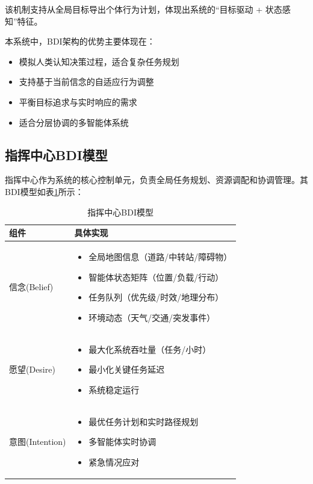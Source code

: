 \documentclass[12pt,a4paper]{article}
\begin{document}
该机制支持从全局目标导出个体行为计划，体现出系统的“目标驱动 + 状态感知”特征。

本系统中，BDI架构的优势主要体现在：
\begin{itemize}
    \item 模拟人类认知决策过程，适合复杂任务规划
    \item 支持基于当前信念的自适应行为调整
    \item 平衡目标追求与实时响应的需求
    \item 适合分层协调的多智能体系统
\end{itemize}

\subsection{指挥中心BDI模型}

指挥中心作为系统的核心控制单元，负责全局任务规划、资源调配和协调管理。其BDI模型如表\ref{tab:command-center-bdi}所示：

\begin{table}[h]
	\centering
	\caption{指挥中心BDI模型}
	\label{tab:command-center-bdi}
	\begin{tabular}{|>{\centering\arraybackslash}p{3cm}|>{\raggedright\arraybackslash}p{11cm}|}
		\hline
		\textbf{组件} & \textbf{具体实现} \\
		\hline
		\rowcolor{lightgray}
		信念(Belief) & 
		\begin{itemize}[leftmargin=*,nosep]
			\item 全局地图信息（道路/中转站/障碍物）
			\item 智能体状态矩阵（位置/负载/行动）
			\item 任务队列（优先级/时效/地理分布）
			\item 环境动态（天气/交通/突发事件）
		\end{itemize} \\
		\hline
		愿望(Desire) & 
		\begin{itemize}[leftmargin=*,nosep]
			\item 最大化系统吞吐量（任务/小时）
			\item 最小化关键任务延迟
			\item 系统稳定运行
		\end{itemize} \\
		\hline
		\rowcolor{lightgray}
		意图(Intention) & 
		\begin{itemize}[leftmargin=*,nosep]
			\item 最优任务计划和实时路径规划
			\item 多智能体实时协调
			\item 紧急情况应对
		\end{itemize} \\
		\hline
	\end{tabular}
\end{table}
\end{document}
